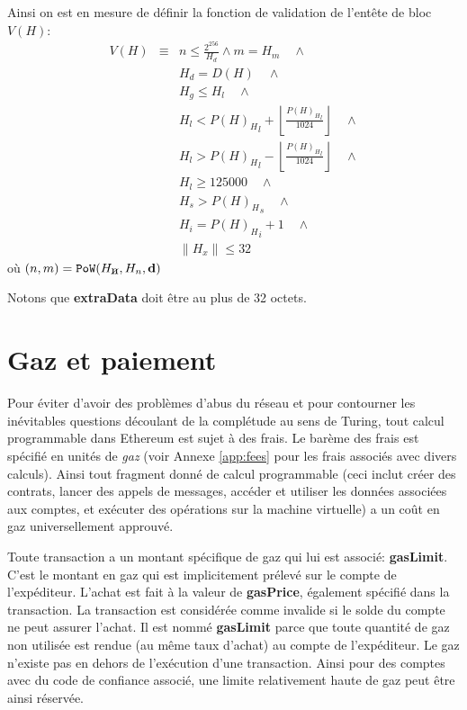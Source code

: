 \documentclass[9pt,oneside]{amsart}
\newcommand{\hcancel}[1]{%
    \tikz[baseline=(tocancel.base)]{
        \node[inner sep=0pt,outer sep=0pt] (tocancel) {#1};
        \draw[black] (tocancel.south west) -- (tocancel.north east);
    }%
}%
\begin{document}
\begin{multicols}{2}
Ainsi on est en mesure de définir la fonction de validation de l'entête de bloc $V(H)$:
\begin{eqnarray}
V(H) & \equiv &  n \leqslant \frac{2^{256}}{H_d} \wedge m = H_m \quad \wedge \\
& & H_d = D(H) \quad \wedge \\
& & H_g \le H_l  \quad \wedge \\
& & H_l < {P(H)_H}_l + \left\lfloor\frac{{P(H)_H}_l}{1024}\right\rfloor  \quad \wedge \\
& & H_l > {P(H)_H}_l - \left\lfloor\frac{{P(H)_H}_l}{1024}\right\rfloor  \quad \wedge \\
& & H_l \geqslant 125000  \quad \wedge \\
& & H_s > {P(H)_H}_s \quad \wedge \\
& & H_i = {P(H)_H}_i +1 \quad \wedge \\
& & \lVert H_x \rVert \le 32
\end{eqnarray}
où $(n, m) = \mathtt{PoW}(H_{\hcancel{n}}, H_n, \mathbf{d})$

Notons que \textbf{extraData} doit être au plus de 32 octets.

\section{Gaz et paiement} \label{ch:payment}

Pour éviter d'avoir des problèmes d'abus du réseau et pour contourner les inévitables questions découlant de la complétude au sens de Turing, tout calcul programmable dans Ethereum est sujet à des frais. Le barème des frais est spécifié en unités de \textit{gaz} (voir Annexe \ref{app:fees} pour les frais associés avec divers calculs). Ainsi tout fragment donné de calcul programmable (ceci inclut créer des contrats, lancer des appels de messages, accéder et utiliser les données associées aux comptes, et exécuter des opérations sur la machine virtuelle) a un coût en gaz universellement approuvé.

Toute transaction a un montant spécifique de gaz qui lui est associé: \textbf{gasLimit}. C'est le montant en gaz qui est implicitement prélevé sur le compte de l'expéditeur. L'achat est fait à la valeur de \textbf{gasPrice}, également spécifié dans la transaction. La transaction est considérée comme invalide si le solde du compte ne peut assurer l'achat. Il est nommé \textbf{gasLimit} parce que toute quantité de gaz non utilisée est rendue (au même taux d'achat) au compte de l'expéditeur. Le gaz n'existe pas en dehors de l'exécution d'une transaction. Ainsi pour des comptes avec du code de confiance associé, une limite relativement haute de gaz peut être ainsi réservée.


\end{multicols}
\end{document}
